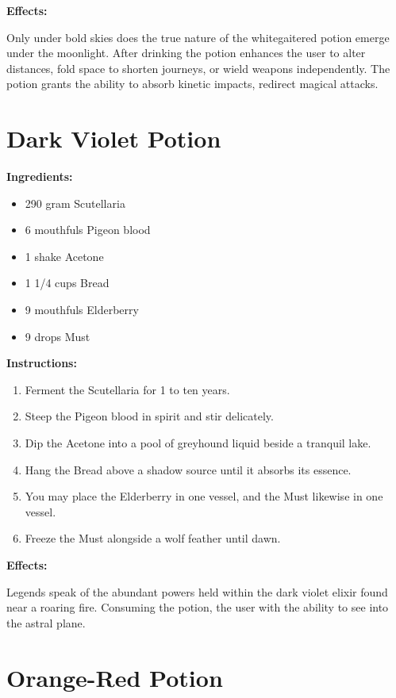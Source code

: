 \documentclass{article}
\begin{document}
\textbf{Effects:}

Only under bold skies does the true nature of the whitegaitered potion emerge under the moonlight. After drinking the potion enhances the user to alter distances, fold space to shorten journeys, or wield weapons independently. The potion grants the ability to absorb kinetic impacts, redirect magical attacks.

\newpage
\section*{Dark Violet Potion}

\textbf{Ingredients:}

\begin{itemize}
  \item 290 gram Scutellaria
  \item 6 mouthfuls Pigeon blood
  \item 1 shake Acetone
  \item 1 1/4 cups Bread
  \item 9 mouthfuls Elderberry
  \item 9 drops Must
\end{itemize}

\textbf{Instructions:}

\begin{enumerate}
  \item Ferment the Scutellaria for 1 to ten years.
  \item Steep the Pigeon blood in spirit and stir delicately.
  \item Dip the Acetone into a pool of greyhound liquid beside a tranquil lake.
  \item Hang the Bread above a shadow source until it absorbs its essence.
  \item You may place the Elderberry in one vessel, and the Must likewise in one vessel.
  \item Freeze the Must alongside a wolf feather until dawn.
\end{enumerate}

\textbf{Effects:}

Legends speak of the abundant powers held within the dark violet elixir found near a roaring fire. Consuming the potion, the user with the ability to see into the astral plane.

\newpage
\section*{Orange-Red Potion}
\end{document}
